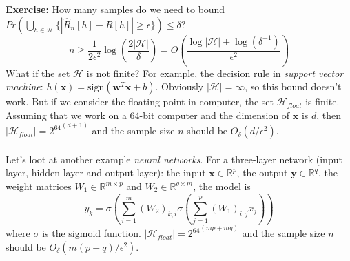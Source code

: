 \documentclass[12pt]{report}
\def\cH{\mathcal H}
\def\bx{\bm{x}}
\def\by{\bm{y}}
\def\bw{\bm{w}}
\def\bbR{\mathbb R}
\begin{document}
\textbf{Exercise:} How many samples do we need to bound $Pr \left( \bigcup_{h \in \cH}\{ |\hat R_n [h] - R[h]| \geq \epsilon \} \right) \leq \delta$? 
\begin{equation}
\label{eq:for_n}
	n \geq \frac{1}{2 \epsilon^2} \log{\left( \frac{2|\cH|}{\delta}\right)} = O \left( \frac{\log|\cH| + \log(\delta^{-1})}{\epsilon^2}\right)
\end{equation}
What if the set $\cH$ is not finite? For example, the decision rule in \emph{support vector machine}: $h(\bx) = \text{sign}(\bw^T\bx + b)$. Obviously $|\cH| = \infty$, so this bound doesn't work. But if we consider the floating-point in computer, the set $\cH_{float}$ is finite. Assuming that we work on a 64-bit computer and the dimension of $\bx$ is $d$, then $|\cH_{float}| = {2^{64}}^{(d+1)}$ and the sample size $n$ should be $O_{\delta}(d/\epsilon^2)$. 
~\\~\\
Let's loot at another example \emph{neural networks}. For a three-layer network (input layer, hidden layer and output layer): the input $\bx \in \bbR^{p}$, the output $\by \in \bbR^{q}$, the weight matrices $W_1 \in \bbR^{m\times p}$ and $W_2 \in \bbR^{q \times m}$, the model is 
\begin{equation}
\label{eq:nn}
	y_k = \sigma {\left(\sum_{i=1}^{m}{(W_2)_{k,i} \sigma{ \left( \sum_{j=1}^{p}{(W_1)_{i,j} x_j} \right)}} \right)}
\end{equation}
where $\sigma$ is the sigmoid function. $|\cH_{float}| = {2^{64}}^{(mp+mq)}$ and the sample size $n$ should be $O_{\delta}(m(p+q)/\epsilon^2)$.
\end{document}
